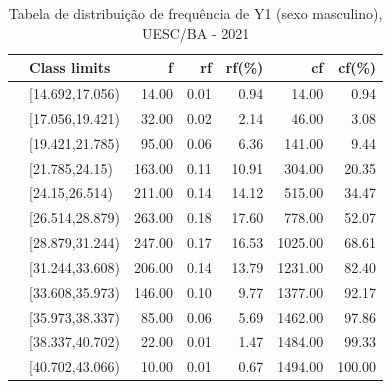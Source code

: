 \documentclass[12pt]{article}\usepackage[]{graphicx}\usepackage[]{color}
\begin{document}
\begin{table}[!ht]
\centering
\caption{Tabela de distribuição de frequência de Y1 (sexo masculino), UESC/BA - 2021}
  \begin{tabular}{rlrrrrr} 
    \toprule
   & Class limits & f & rf & rf(\%) & cf & cf(\%) \\ 
    \midrule
& [14.692,17.056) & 14.00 & 0.01 & 0.94 & 14.00 & 0.94 \\ 
  & [17.056,19.421) & 32.00 & 0.02 & 2.14 & 46.00 & 3.08 \\ 
  & [19.421,21.785) & 95.00 & 0.06 & 6.36 & 141.00 & 9.44 \\ 
  & [21.785,24.15) & 163.00 & 0.11 & 10.91 & 304.00 & 20.35 \\ 
  & [24.15,26.514) & 211.00 & 0.14 & 14.12 & 515.00 & 34.47 \\ 
  & [26.514,28.879) & 263.00 & 0.18 & 17.60 & 778.00 & 52.07 \\ 
  & [28.879,31.244) & 247.00 & 0.17 & 16.53 & 1025.00 & 68.61 \\ 
  & [31.244,33.608) & 206.00 & 0.14 & 13.79 & 1231.00 & 82.40 \\ 
  & [33.608,35.973) & 146.00 & 0.10 & 9.77 & 1377.00 & 92.17 \\ 
    & [35.973,38.337) & 85.00 & 0.06 & 5.69 & 1462.00 & 97.86 \\ 
    & [38.337,40.702) & 22.00 & 0.01 & 1.47 & 1484.00 & 99.33 \\ 
    & [40.702,43.066) & 10.00 & 0.01 & 0.67 & 1494.00 & 100.00 \\ 
     \bottomrule
  \end{tabular}
\end{table}

\end{document}
